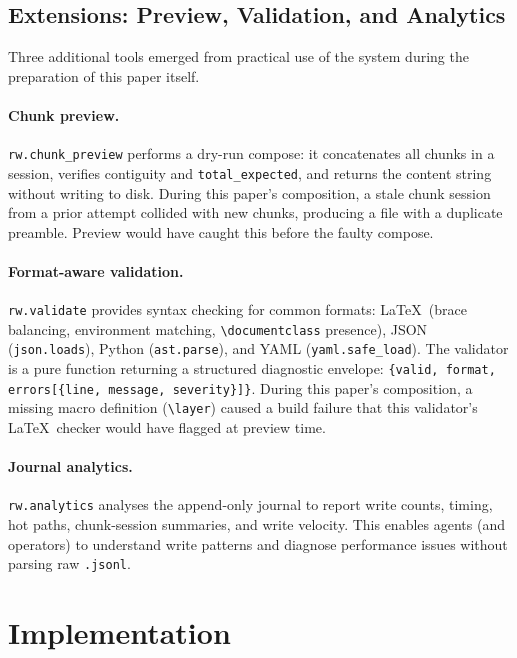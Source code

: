 \documentclass[11pt,twocolumn]{article}
\newcommand{\tool}[1]{\texttt{#1}}
\newcommand{\layer}[1]{\textbf{L#1}}
\begin{document}
\subsection{Extensions: Preview, Validation, and Analytics}
\label{sec:extensions}

Three additional tools emerged from practical use of the system
during the preparation of this paper itself.

\paragraph{Chunk preview.}
\tool{rw.chunk\_preview} performs a dry-run compose: it concatenates
all chunks in a session, verifies contiguity and
\texttt{total\_expected}, and returns the content string without
writing to disk.  During this paper's composition, a stale chunk
session from a prior attempt collided with new chunks, producing a
file with a duplicate preamble.  Preview would have caught this
before the faulty compose.

\paragraph{Format-aware validation.}
\tool{rw.validate} provides syntax checking for common formats:
\LaTeX\ (brace balancing, environment matching, \verb|\documentclass|
presence), JSON (\texttt{json.loads}), Python (\texttt{ast.parse}),
and YAML (\texttt{yaml.safe\_load}).  The validator is a pure function
returning a structured diagnostic envelope:
\texttt{\{valid, format, errors[\{line, message, severity\}]\}}.
During this paper's composition, a missing macro definition
(\verb|\layer|) caused a build failure that this validator's
\LaTeX\ checker would have flagged at preview time.

\paragraph{Journal analytics.}
\tool{rw.analytics} analyses the append-only journal to report
write counts, timing, hot paths, chunk-session summaries, and write
velocity.  This enables agents (and operators) to understand write
patterns and diagnose performance issues without parsing raw
\texttt{.jsonl}.

\section{Implementation}
\label{sec:implementation}
\end{document}
